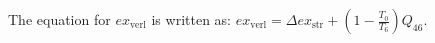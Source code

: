 The equation for \( ex_{\text{verl}} \) is written as:  
\( ex_{\text{verl}} = \Delta ex_{\text{str}} + \left( 1 - \frac{T_0}{T_6} \right) Q_{46} \).
